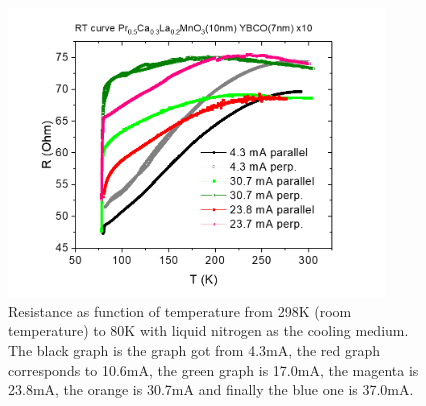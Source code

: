 \documentclass{comjnl}
\begin{document}
\begin{figure}[h]
\centering
\includegraphics[width=100mm]{Bilde2.png}
\caption{Resistance as function of temperature from 298K (room temperature) to 80K with liquid nitrogen as the cooling medium. The black graph is the graph got from 4.3mA, the red graph corresponds to 10.6mA, the green graph is 17.0mA, the magenta is 23.8mA, the orange is 30.7mA and finally the blue one is 37.0mA. \label{fig:res}}
\end{figure}
\end{document}
